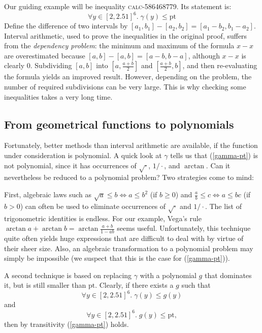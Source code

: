 \documentclass[11pt]{amsart}
\def\sfrac#1#2{{\textstyle \frac {#1} {#2}}}
\def\eqref#1{(\ref{#1})}
\def\calc#1{{\textsc{calc-#1}}}
\def\pt{\mathrm{pt}}
\begin{document}
Our guiding example will be inequality \calc{586468779}. Its statement is:
\begin{equation}
\forall y \in [2,2.51]^6.\; \gamma(y) \le \pt \label{gamma-pt}
\end{equation}
Define the difference of two intervals by $[a_1,b_1]-[a_2,b_2] = [a_1-b_2,b_1-a_2]$.
Interval arithmetic, used to prove the inequalities in the original proof,
suffers from the \emph{dependency problem}: the minimum and maximum of the
formula $x-x$ are overestimated because $[a,b] - [a,b] = [a-b,b-a]$, although
$x-x$ is clearly $0$. Subdividing $[a,b]$ into $[a,\sfrac{a+b}2]$ and
$[\sfrac{a+b}2,b]$, and then re-evaluating the formula yields an improved
result. However, depending on the problem, the number of required subdivisions
can be very large. This is why checking some inequalities takes a very long
time.

\subsection*{From geometrical functions to polynomials}
Fortunately, better methods than interval arithmetic are available, if the
function under consideration is polynomial. A quick look at $\gamma$ tells us
that \eqref{gamma-pt} is not polynomial, since it has occurrences of
$\sqrt\cdot$, $1/\cdot$, and $\arctan$. Can it nevertheless be reduced
to a polynomial problem? Two strategies come to mind:

First, algebraic laws such as $\sqrt a \le b \Leftrightarrow a \le b^2$ (if $b
\ge 0$) and $\frac a b \le c \Leftrightarrow a \le bc$ (if $b>0$) can often be
used to eliminate occurrences of $\sqrt\cdot$ and $1/\cdot$. The list of
trigonometric identities is endless. For our example, Vega's rule $\arctan a +
\arctan b = \arctan \frac {a + b} {1 - ab}$ seems useful. Unfortunately, this
technique quite often yields huge expressions that are difficult to deal with by
virtue of their sheer size. Also, an algebraic transformation to a polynomial problem may
simply be impossible (we suspect that this is the case for \eqref{gamma-pt}).

A second technique is based on replacing $\gamma$ with a polynomial $g$ that
dominates it, but is still smaller than $\pt$. Clearly, if there exists a $g$
such that
\begin{equation}
\forall y \in [2,2.51]^6.\; \gamma(y) \le g(y) \label{gamma-g}
\end{equation}
and
\begin{equation}
\forall y \in [2,2.51]^6.\; g(y) \le \pt, \label{g-pt}
\end{equation}
then by transitivity \eqref{gamma-pt} holds.
\end{document}
